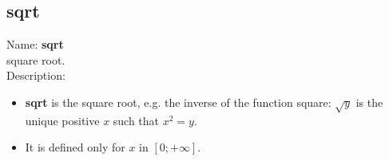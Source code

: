 \subsection{sqrt}
\label{labsqrt}
\noindent Name: \textbf{sqrt}\\
square root.\\

\noindent Description: \begin{itemize}

\item \textbf{sqrt} is the square root, e.g. the inverse of the function square: $\sqrt{y}$
   is the unique positive $x$ such that $x^2=y$.

\item It is defined only for $x$ in $[0;+\infty]$.
\end{itemize}
